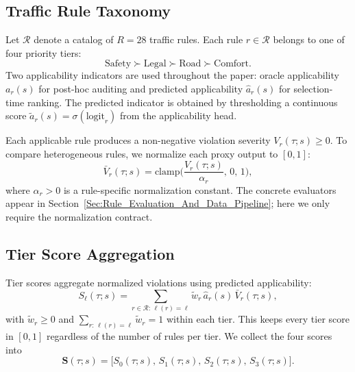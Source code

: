 \subsection{Traffic Rule Taxonomy}
\label{subsec:rule_taxonomy}

Let $\mathcal{R}$ denote a catalog of $R{=}28$ traffic rules. Each rule $r \in \mathcal{R}$ belongs to one of four priority tiers:
\begin{equation}
\text{Safety} \succ \text{Legal} \succ \text{Road} \succ \text{Comfort}.
\end{equation}
Two applicability indicators are used throughout the paper: oracle applicability $a_r(s)$ for post-hoc auditing and predicted applicability $\hat{a}_r(s)$ for selection-time ranking. The predicted indicator is obtained by thresholding a continuous score $\tilde{a}_r(s)=\sigma(\mathrm{logit}_r)$ from the applicability head.

Each applicable rule produces a non-negative violation severity $V_r(\tau;s)\ge 0$. To compare heterogeneous rules, we normalize each proxy output to $[0,1]$:
\begin{equation}
\label{eq:normalization_contract}
\bar{V}_r(\tau;s)=\mathrm{clamp}\!\Big(\frac{V_r(\tau;s)}{\alpha_r},\,0,\,1\Big),
\end{equation}
where $\alpha_r>0$ is a rule-specific normalization constant. The concrete evaluators appear in Section~\ref{Sec:Rule_Evaluation_And_Data_Pipeline}; here we only require the normalization contract.

\subsection{Tier Score Aggregation}
\label{subsec:tier_aggregation}

Tier scores aggregate normalized violations using predicted applicability:
\begin{equation}
\label{eq:tier_score}
S_\ell(\tau;s)=\sum_{r \in \mathcal{R}:\,\ell(r)=\ell} \tilde{w}_r\,\hat{a}_r(s)\,\bar{V}_r(\tau;s),
\end{equation}
with $\tilde{w}_r \ge 0$ and $\sum_{r:\,\ell(r)=\ell}\tilde{w}_r = 1$ within each tier. This keeps every tier score in $[0,1]$ regardless of the number of rules per tier. We collect the four scores into
\begin{equation}
\mathbf{S}(\tau;s)=\big[S_0(\tau;s),\,S_1(\tau;s),\,S_2(\tau;s),\,S_3(\tau;s)\big].
\end{equation}

